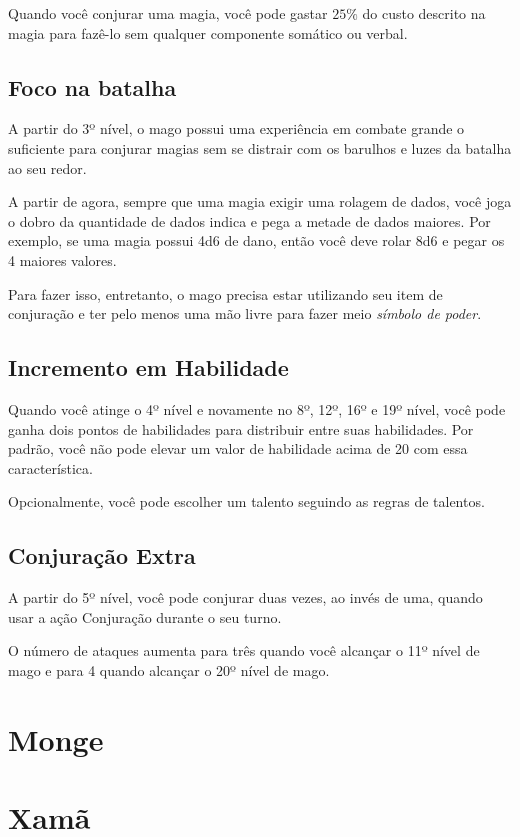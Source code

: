 \documentclass{RPG_Adventure}[2021/10/20]
\begin{document}
Quando você conjurar uma magia, você pode gastar $25\%$ do custo descrito na
magia para fazê-lo sem qualquer componente somático ou verbal.

\section*{Foco na batalha}%

A partir do 3º nível, o mago possui uma experiência em combate grande o
suficiente para conjurar magias sem se distrair com os barulhos e luzes da
batalha ao seu redor.

A partir de agora, sempre que uma magia exigir uma rolagem de dados, você joga o
dobro da quantidade de dados indica e pega a metade de dados maiores. Por
exemplo, se uma magia possui 4d6 de dano, então você deve rolar 8d6 e pegar os
4 maiores valores.

Para fazer isso, entretanto, o mago precisa estar utilizando seu item de
conjuração e ter pelo menos uma mão livre para fazer meio \textit{símbolo de
poder}.

\section*{Incremento em Habilidade}%

Quando você atinge o 4º nível e novamente no 8º, 12º, 16º e 19º nível, você pode
ganha dois pontos de habilidades para distribuir entre suas habilidades. Por
padrão, você não pode elevar um valor de habilidade acima de 20 com essa
característica.

Opcionalmente, você pode escolher um talento seguindo as regras de talentos.

\section*{Conjuração Extra}%

A partir do 5º nível, você pode conjurar duas vezes, ao invés de uma, quando
usar a ação Conjuração durante o seu turno.

O número de ataques aumenta para três quando você alcançar o 11º nível de
mago e para 4 quando alcançar o 20º nível de mago.


\chapter{Monge}%
\label{cha:monge}


\chapter{Xamã}%
\label{cha:xama}
\end{document}
